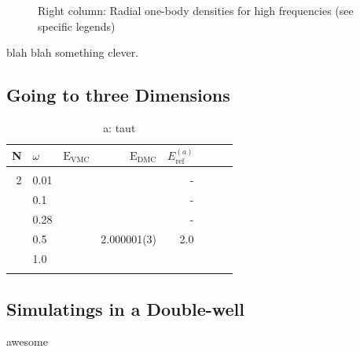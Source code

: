 \begin{figure}
\begin{center}
\begin{tabular}{lr}
  \end{tabular}
  \caption{Right column: Radial one-body densities for high frequencies (see specific legends)}
  \label{fig:OBD_collapsed_w001}
 \end{center}
\end{figure}

\setlength{\tabcolsep}{6pt}
\captionsetup[subfloat]{labelformat=parens}


blah blah something clever.


\subsection{Going to three Dimensions}

\begin{table}
\begin{center}
\begin{tabular}{rl|rrrrrr}
    N     & $\omega$ & $\mathrm{E_{VMC}}$ & $\mathrm{E_{DMC}}$ & $E_\mathrm{ref}^{(a)}$\\
\hline\hline
\multicolumn{8}{c}{} \\
    2     &   0.01   &   &    & -		\\
          &   0.1    &   &    & - 		\\
          &   0.28   &   &    & -		\\
          &   0.5    &   & 2.000001(3)  & 2.0 \\
          &   1.0    &   &   & \\
\cline{2-5}
\multicolumn{5}{c}{} \\
\hline\hline
\end{tabular}
\caption{a: taut}
\label{tab:QDotsResults3D}
\end{center}
\end{table}


\subsection{Simulatings in a Double-well}

awesome